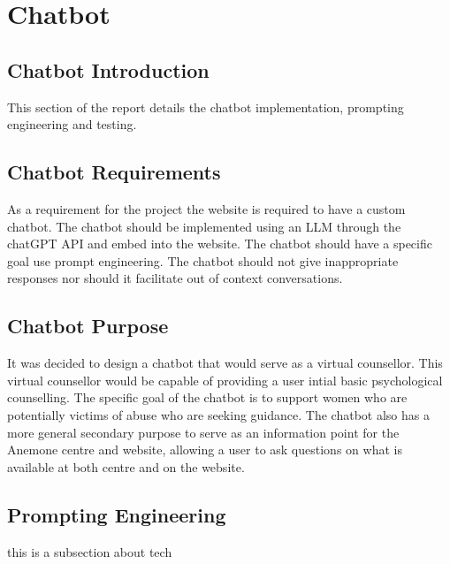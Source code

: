 \section{Chatbot}
\subsection{Chatbot Introduction}

This section of the report details the chatbot implementation, prompting engineering and testing. 

\subsection{Chatbot Requirements}
As a requirement for the project the website is required to have a custom chatbot. 
The chatbot should be implemented using an LLM through the chatGPT API and embed into the website. 
The chatbot should have a specific goal use prompt engineering. 
The chatbot should not give inappropriate responses nor should it facilitate out of context conversations.

\subsection{Chatbot Purpose}
It was decided to design a chatbot that would serve as a virtual counsellor. 
This virtual counsellor would be capable of providing a user intial basic psychological counselling.
The specific goal of the chatbot is to support women who are potentially victims of abuse who are seeking guidance. 
The chatbot also has a more general secondary purpose to serve as an information point for the Anemone centre and website, 
allowing a user to ask questions on what is available at both centre and on the website. 

\subsection{Prompting Engineering}
this is a subsection about tech

